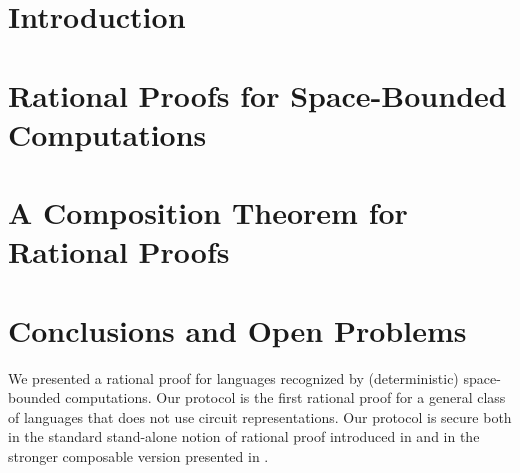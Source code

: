 	
	\section{Introduction}
	
	
	
	
	
	
	\section{Rational Proofs for Space-Bounded Computations }
	
	
	\section{A Composition Theorem for Rational Proofs}
	
		
				
	
	
	
	
	
	
	
	\section{Conclusions and Open Problems}
	We presented a rational proof for languages recognized by (deterministic) 
	space-bounded computations. Our protocol is the first rational proof for a general class of languages that does not use circuit representations. Our protocol is secure both in the standard stand-alone notion of rational proof introduced in 
	\cite{am} and in the stronger composable version presented in \cite{cg15}. 
	
